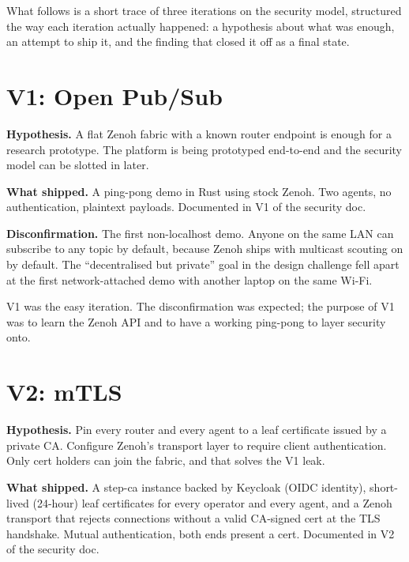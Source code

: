 \documentclass[11pt,a4paper]{article}
\begin{document}
What follows is a short trace of three iterations on the security
model, structured the way each iteration actually happened: a
hypothesis about what was enough, an attempt to ship it, and the
finding that closed it off as a final state.

\section{V1: Open Pub/Sub}

\textbf{Hypothesis.} A flat Zenoh fabric with a known router
endpoint is enough for a research prototype. The platform is being
prototyped end-to-end and the security model can be slotted in
later.

\textbf{What shipped.} A ping-pong demo in Rust using stock Zenoh.
Two agents, no authentication, plaintext payloads. Documented in
V1 of the security doc.

\textbf{Disconfirmation.} The first non-localhost demo. Anyone on
the same LAN can subscribe to any topic by default, because Zenoh
ships with multicast scouting on by default. The
``decentralised but private'' goal in the design challenge fell
apart at the first network-attached demo with another laptop on
the same Wi-Fi.

V1 was the easy iteration. The disconfirmation was expected; the
purpose of V1 was to learn the Zenoh API and to have a working
ping-pong to layer security onto.

\section{V2: mTLS}

\textbf{Hypothesis.} Pin every router and every agent to a leaf
certificate issued by a private CA. Configure Zenoh's transport
layer to require client authentication. Only cert holders can
join the fabric, and that solves the V1 leak.

\textbf{What shipped.} A step-ca instance backed by Keycloak (OIDC
identity), short-lived (24-hour) leaf certificates for every
operator and every agent, and a Zenoh transport that rejects
connections without a valid CA-signed cert at the TLS handshake.
Mutual authentication, both ends present a cert. Documented in V2
of the security doc.
\end{document}
